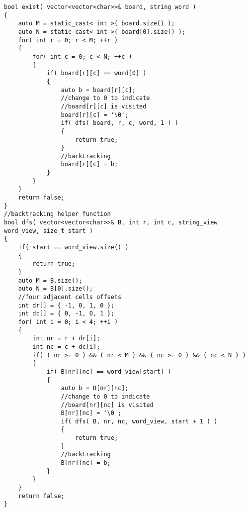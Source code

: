 \setcounter{lstlisting}{0}
\begin{lstlisting}[style=customc, caption={Backtracking}]
bool exist( vector<vector<char>>& board, string word )
{
    auto M = static_cast< int >( board.size() );
    auto N = static_cast< int >( board[0].size() );
    for( int r = 0; r < M; ++r )
    {
        for( int c = 0; c < N; ++c )
        {
            if( board[r][c] == word[0] )
            {
                auto b = board[r][c];
                //change to 0 to indicate
                //board[r][c] is visited
                board[r][c] = '\0';
                if( dfs( board, r, c, word, 1 ) )
                {
                    return true;
                }
                //backtracking
                board[r][c] = b;
            }
        }
    }
    return false;
}
//backtracking helper function
bool dfs( vector<vector<char>>& B, int r, int c, string_view word_view, size_t start )
{
    if( start == word_view.size() )
    {
        return true;
    }
    auto M = B.size();
    auto N = B[0].size();
    //four adjacent cells offsets
    int dr[] = { -1, 0, 1, 0 };
    int dc[] = { 0, -1, 0, 1 };
    for( int i = 0; i < 4; ++i )
    {
        int nr = r + dr[i];
        int nc = c + dc[i];
        if( ( nr >= 0 ) && ( nr < M ) && ( nc >= 0 ) && ( nc < N ) )
        {
            if( B[nr][nc] == word_view[start] )
            {
                auto b = B[nr][nc];
                //change to 0 to indicate
                //board[nr][nc] is visited
                B[nr][nc] = '\0';
                if( dfs( B, nr, nc, word_view, start + 1 ) )
                {
                    return true;
                }
                //backtracking
                B[nr][nc] = b;
            }
        }
    }
    return false;
}
\end{lstlisting} 